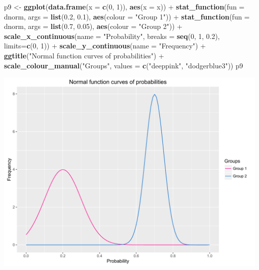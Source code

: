 \documentclass[]{article}
\newenvironment{Shaded}{\begin{snugshade}}{\end{snugshade}}
\newcommand{\KeywordTok}[1]{\textcolor[rgb]{0.13,0.29,0.53}{\textbf{{#1}}}}
\newcommand{\DataTypeTok}[1]{\textcolor[rgb]{0.13,0.29,0.53}{{#1}}}
\newcommand{\DecValTok}[1]{\textcolor[rgb]{0.00,0.00,0.81}{{#1}}}
\newcommand{\FloatTok}[1]{\textcolor[rgb]{0.00,0.00,0.81}{{#1}}}
\newcommand{\StringTok}[1]{\textcolor[rgb]{0.31,0.60,0.02}{{#1}}}
\newcommand{\NormalTok}[1]{{#1}}
\begin{document}
\begin{Shaded}
\begin{Highlighting}[]
\NormalTok{p9 <-}\StringTok{ }\KeywordTok{ggplot}\NormalTok{(}\KeywordTok{data.frame}\NormalTok{(}\DataTypeTok{x =} \KeywordTok{c}\NormalTok{(}\DecValTok{0}\NormalTok{, }\DecValTok{1}\NormalTok{)), }\KeywordTok{aes}\NormalTok{(}\DataTypeTok{x =} \NormalTok{x)) +}
\StringTok{        }\KeywordTok{stat_function}\NormalTok{(}\DataTypeTok{fun =} \NormalTok{dnorm, }\DataTypeTok{args =} \KeywordTok{list}\NormalTok{(}\FloatTok{0.2}\NormalTok{, }\FloatTok{0.1}\NormalTok{),}
                      \KeywordTok{aes}\NormalTok{(}\DataTypeTok{colour =} \StringTok{"Group 1"}\NormalTok{)) +}
\StringTok{        }\KeywordTok{stat_function}\NormalTok{(}\DataTypeTok{fun =} \NormalTok{dnorm, }\DataTypeTok{args =} \KeywordTok{list}\NormalTok{(}\FloatTok{0.7}\NormalTok{, }\FloatTok{0.05}\NormalTok{),}
                      \KeywordTok{aes}\NormalTok{(}\DataTypeTok{colour =} \StringTok{"Group 2"}\NormalTok{)) +}
\StringTok{        }\KeywordTok{scale_x_continuous}\NormalTok{(}\DataTypeTok{name =} \StringTok{"Probability"}\NormalTok{,}
                              \DataTypeTok{breaks =} \KeywordTok{seq}\NormalTok{(}\DecValTok{0}\NormalTok{, }\DecValTok{1}\NormalTok{, }\FloatTok{0.2}\NormalTok{),}
                              \DataTypeTok{limits=}\KeywordTok{c}\NormalTok{(}\DecValTok{0}\NormalTok{, }\DecValTok{1}\NormalTok{)) +}
\StringTok{        }\KeywordTok{scale_y_continuous}\NormalTok{(}\DataTypeTok{name =} \StringTok{"Frequency"}\NormalTok{) +}
\StringTok{        }\KeywordTok{ggtitle}\NormalTok{(}\StringTok{"Normal function curves of probabilities"}\NormalTok{) +}
\StringTok{        }\KeywordTok{scale_colour_manual}\NormalTok{(}\StringTok{"Groups"}\NormalTok{, }\DataTypeTok{values =} \KeywordTok{c}\NormalTok{(}\StringTok{"deeppink"}\NormalTok{, }\StringTok{"dodgerblue3"}\NormalTok{))}
\NormalTok{p9}
\end{Highlighting}
\end{Shaded}

\begin{center}\includegraphics{0_all_posts_pdf/function_10-1} \end{center}
\end{document}
